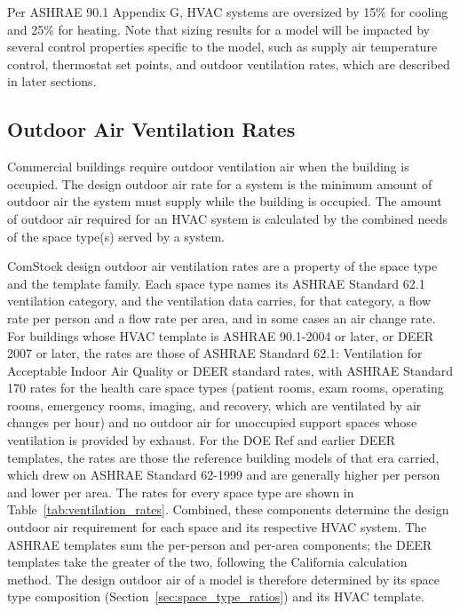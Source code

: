 Per ASHRAE 90.1 Appendix G, HVAC systems are oversized by 15\% for cooling and 25\% for heating. Note that sizing results for a model will be impacted by several control properties specific to the model, such as supply air temperature control, thermostat set points, and outdoor ventilation rates, which are described in later sections.

\subsection{Outdoor Air Ventilation Rates}

Commercial buildings require outdoor ventilation air when the building is occupied. The design outdoor air rate for a system is the minimum amount of outdoor air the system must supply while the building is occupied. The amount of outdoor air required for an HVAC system is calculated by the combined needs of the space type(s) served by a system.

ComStock design outdoor air ventilation rates are a property of the space type and the template family. Each space type names its ASHRAE Standard 62.1 ventilation category, and the ventilation data carries, for that category, a flow rate per person and a flow rate per area, and in some cases an air change rate. For buildings whose HVAC template is ASHRAE 90.1-2004 or later, or DEER 2007 or later, the rates are those of ASHRAE Standard 62.1: Ventilation for Acceptable Indoor Air Quality or DEER standard rates, with ASHRAE Standard 170 rates for the health care space types (patient rooms, exam rooms, operating rooms, emergency rooms, imaging, and recovery, which are ventilated by air changes per hour) and no outdoor air for unoccupied support spaces whose ventilation is provided by exhaust. For the DOE Ref and earlier DEER templates, the rates are those the reference building models of that era carried, which drew on ASHRAE Standard 62-1999 and are generally higher per person and lower per area. The rates for every space type are shown in Table~\ref{tab:ventilation_rates}. Combined, these components determine the design outdoor air requirement for each space and its respective HVAC system. The ASHRAE templates sum the per-person and per-area components; the DEER templates take the greater of the two, following the California calculation method. The design outdoor air of a model is therefore determined by its space type composition (Section~\ref{sec:space_type_ratios}) and its HVAC template.

